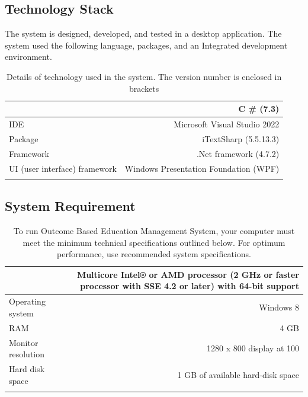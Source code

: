 \documentclass[12pt,a4paper]{article}
\begin{document}
\subsection{Technology Stack}
The system is designed, developed, and tested in a desktop application. The system used the following language, packages, and an Integrated development environment.\\
\begin{longtable}{lr} 
 \caption{Details of technology used in the system. The version number is enclosed in brackets }\\
\begin{tabular}{ | m{4cm} | m{12cm}| } 
  \hline
Language & C \#  (7.3)  \\\hline
IDE  & Microsoft Visual Studio 2022\\ \hline 
Package    &  iTextSharp (5.5.13.3) \\ \hline 
Framework & .Net framework (4.7.2) \\ \hline
UI (user interface) framework    & Windows Presentation Foundation (WPF)\\ \hline
\end{tabular}
\end{longtable}
\subsection{System Requirement}
\begin{longtable}{lr} 
 \caption{To run Outcome Based Education Management  System, your computer must meet the minimum technical specifications outlined below. For optimum performance, use recommended system specifications.}\\
\begin{tabular}{ | m{4cm} | m{12cm}| } \hline
Processor & 
Multicore Intel® or AMD processor (2 GHz or faster processor with SSE 4.2 or later) with 64-bit support
 \\ \hline
Operating system & Windows 8
 \\ \hline
RAM & 4 GB
 \\ \hline
Monitor resolution & 1280 x 800 display at 100%
 \\ \hline
Hard disk space & 1 GB of available hard-disk space
  \\ \hline
\end{tabular}
\end{longtable}
\end{document}
